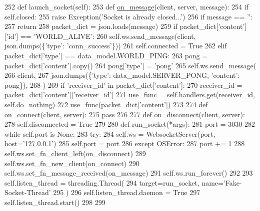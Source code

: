 \begin{DoxyCode}
252     \textcolor{keyword}{def }launch\_socket(self):
253         \textcolor{keyword}{def }\hyperlink{namespaceparlai_1_1chat__service_1_1services_1_1browser__chat_1_1client_a01c1536b48e2f5badd2fe58ea02b9a5c}{on\_message}(client, server, message):
254             \textcolor{keywordflow}{if} self.closed:
255                 \textcolor{keywordflow}{raise} Exception(\textcolor{stringliteral}{'Socket is already closed...'})
256             \textcolor{keywordflow}{if} message == \textcolor{stringliteral}{''}:
257                 \textcolor{keywordflow}{return}
258             packet\_dict = json.loads(message)
259             \textcolor{keywordflow}{if} packet\_dict[\textcolor{stringliteral}{'content'}][\textcolor{stringliteral}{'id'}] == \textcolor{stringliteral}{'WORLD\_ALIVE'}:
260                 self.ws.send\_message(client, json.dumps(\{\textcolor{stringliteral}{'type'}: \textcolor{stringliteral}{'conn\_success'}\}))
261                 self.connected = \textcolor{keyword}{True}
262             \textcolor{keywordflow}{elif} packet\_dict[\textcolor{stringliteral}{'type'}] == data\_model.WORLD\_PING:
263                 pong = packet\_dict[\textcolor{stringliteral}{'content'}].copy()
264                 pong[\textcolor{stringliteral}{'type'}] = \textcolor{stringliteral}{'pong'}
265                 self.ws.send\_message(
266                     client,
267                     json.dumps(\{\textcolor{stringliteral}{'type'}: data\_model.SERVER\_PONG, \textcolor{stringliteral}{'content'}: pong\}),
268                 )
269             \textcolor{keywordflow}{if} \textcolor{stringliteral}{'receiver\_id'} \textcolor{keywordflow}{in} packet\_dict[\textcolor{stringliteral}{'content'}]:
270                 receiver\_id = packet\_dict[\textcolor{stringliteral}{'content'}][\textcolor{stringliteral}{'receiver\_id'}]
271                 use\_func = self.handlers.get(receiver\_id, self.do\_nothing)
272                 use\_func(packet\_dict[\textcolor{stringliteral}{'content'}])
273 
274         \textcolor{keyword}{def }on\_connect(client, server):
275             \textcolor{keywordflow}{pass}
276 
277         \textcolor{keyword}{def }on\_disconnect(client, server):
278             self.disconnected = \textcolor{keyword}{True}
279 
280         \textcolor{keyword}{def }run\_socket(*args):
281             port = 3030
282             \textcolor{keywordflow}{while} self.port \textcolor{keywordflow}{is} \textcolor{keywordtype}{None}:
283                 \textcolor{keywordflow}{try}:
284                     self.ws = WebsocketServer(port, host=\textcolor{stringliteral}{'127.0.0.1'})
285                     self.port = port
286                 \textcolor{keywordflow}{except} OSError:
287                     port += 1
288             self.ws.set\_fn\_client\_left(on\_disconnect)
289             self.ws.set\_fn\_new\_client(on\_connect)
290             self.ws.set\_fn\_message\_received(on\_message)
291             self.ws.run\_forever()
292 
293         self.listen\_thread = threading.Thread(
294             target=run\_socket, name=\textcolor{stringliteral}{'Fake-Socket-Thread'}
295         )
296         self.listen\_thread.daemon = \textcolor{keyword}{True}
297         self.listen\_thread.start()
298 
299 
\end{DoxyCode}
